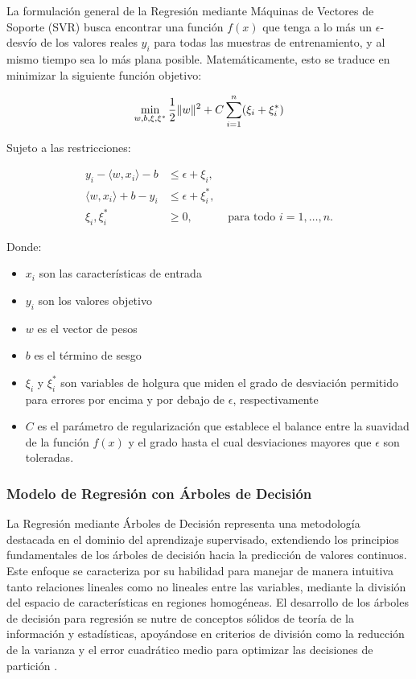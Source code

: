 \documentclass[
  11pt,
  bookmarksnumbered]{article}
\begin{document}
La formulación general de la Regresión mediante Máquinas de Vectores de Soporte (SVR) busca encontrar una función \(f(x)\) que tenga a lo más un \(\epsilon\)-desvío de los valores reales \(y_i\) para todas las muestras de entrenamiento, y al mismo tiempo sea lo más plana posible.
Matemáticamente, esto se traduce en minimizar la siguiente función objetivo:


\begin{equation}
\large \min_{w, b, \xi, \xi^*} \frac{1}{2} \|w\|^2 + C \sum_{i=1}^{n} (\xi_i + \xi_i^*) \end{equation}

Sujeto a las restricciones:

\[
\begin{aligned}
y_i - \langle w, x_i \rangle - b &\leq \epsilon + \xi_i, \\
\langle w, x_i \rangle + b - y_i &\leq \epsilon + \xi_i^*, \\
\xi_i, \xi_i^* &\geq 0, &\text{ para todo } i = 1, \ldots, n.
\end{aligned}
\]

Donde:

\begin{itemize}
\item
  \(x_i\) son las características de entrada
\item
  \(y_i\) son los valores objetivo
\item
  \(w\) es el vector de pesos
\item
  \(b\) es el término de sesgo
\item
  \(\xi_i\) y \(\xi_i^*\) son variables de holgura que miden el grado de desviación permitido para errores por encima y por debajo de \(\epsilon\), respectivamente
\item
  \(C\) es el parámetro de regularización que establece el balance entre la suavidad de la función \(f(x)\) y el grado hasta el cual desviaciones mayores que \(\epsilon\) son toleradas.
\end{itemize}

\hypertarget{modelo-de-regresiuxf3n-con-uxe1rboles-de-decisiuxf3n}{%
\subsubsection{Modelo de Regresión con Árboles de Decisión}\label{modelo-de-regresiuxf3n-con-uxe1rboles-de-decisiuxf3n}}

La Regresión mediante Árboles de Decisión representa una metodología destacada en el dominio del aprendizaje supervisado, extendiendo los principios fundamentales de los árboles de decisión hacia la predicción de valores continuos.
Este enfoque se caracteriza por su habilidad para manejar de manera intuitiva tanto relaciones lineales como no lineales entre las variables, mediante la división del espacio de características en regiones homogéneas.
El desarrollo de los árboles de decisión para regresión se nutre de conceptos sólidos de teoría de la información y estadísticas, apoyándose en criterios de división como la reducción de la varianza y el error cuadrático medio para optimizar las decisiones de partición \textcite{Breiman1984}.
\end{document}
